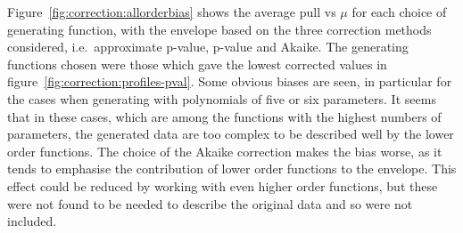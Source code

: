 Figure~\ref{fig:correction:allorderbias} shows the average pull vs $\mu$
for each choice of generating function, with the envelope based on the
three correction methods considered, i.e.~approximate p-value, p-value
and Akaike.
The generating functions chosen were those
which gave the lowest corrected \nll values in
figure~\ref{fig:correction:profiles-pval}.
Some obvious biases are seen, in particular for the cases when
generating with polynomials of five or six parameters. It seems that in these
cases, which are among the functions with the highest numbers of parameters,
the generated data are too complex to be described well by the lower order
functions. The choice of the Akaike correction makes the bias worse, as it
tends to emphasise the contribution of lower order functions to the envelope.
This effect could be reduced by working with even higher order functions, but
these were not found to be needed to describe the original data and so were
not included.

